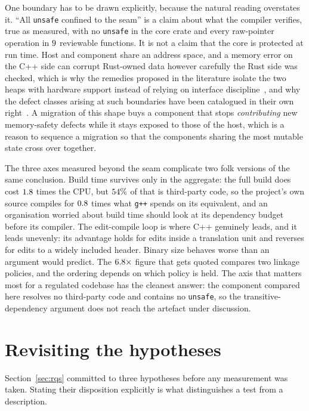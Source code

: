\documentclass[english,oneside,a4paper,censored,csm,software-track-2020]{HYthesisML}
\begin{document}
One boundary has to be drawn explicitly, because the natural reading overstates it. ``All
\texttt{unsafe} confined to the seam'' is a claim about what the compiler verifies, true as
measured, with no \texttt{unsafe} in the core crate and every raw-pointer operation in
$9$ reviewable functions. It is not a claim that the core is protected at run time.
Host and component share an address space, and a memory error on the C++ side can corrupt
Rust-owned data however carefully the Rust side was checked, which is why the remedies proposed in
the literature isolate the two heaps with hardware support instead of relying on interface
discipline~\cite{rivera2021galeed,kirth2022pkrusafe}, and why the defect classes arising at such
boundaries have been catalogued in their own right~\cite{li2022crosslang}. A migration of this
shape buys a component that stops \emph{contributing} new memory-safety defects while it stays
exposed to those of the host, which is a reason to sequence a migration so that the components
sharing the most mutable state cross over together.

The three axes measured beyond the seam complicate two folk versions of the same conclusion. Build
time survives only in the aggregate: the full build does cost $1.8$ times the CPU,
but $54\%$ of that is third-party code, so the project's own source compiles for
$0.8$ times what \texttt{g++} spends on its equivalent, and an
organisation worried about build time should look at its dependency budget before its compiler.
The edit-compile loop is where C++ genuinely leads, and it leads unevenly: its advantage holds for
edits inside a translation unit and reverses for edits to a widely included header. Binary size
behaves worse than an argument would predict. The $6.8\times$ figure that gets
quoted compares two linkage policies, and the ordering depends on which policy is held. The axis that
matters most for a regulated codebase has the cleanest answer: the component compared here
resolves no third-party code and contains no \texttt{unsafe}, so the transitive-dependency
argument does not reach the artefact under discussion.

\section{Revisiting the hypotheses}\label{sec:hypotheses}
Section~\ref{sec:rqs} committed to three hypotheses before any measurement was taken. Stating
their disposition explicitly is what distinguishes a test from a description.
\end{document}
